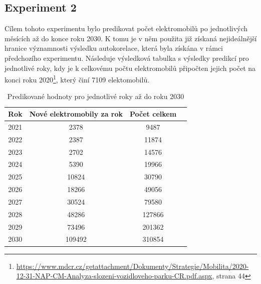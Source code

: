 \documentclass[14pt]{extarticle}
\begin{document}
    \subsection{Experiment 2}
    Cílem tohoto experimentu bylo predikovat počet elektromobilů po jednotlivých měsících až do konce roku 2030. K tomu je v něm použita již získaná nejideálnější hranice významnosti výsledku autokorelace, která byla získána v rámci předchozího experimentu. Následuje výsledková tabulka s výsledky predikcí pro jednotlivé roky, kdy je k celkovému počtu elektromobilů připočten jejich počet na konci roku 2020\footnote{\url{https://www.mdcr.cz/getattachment/Dokumenty/Strategie/Mobilita/2020-12-31-NAP-CM-Analyza-slozeni-vozidloveho-parku-CR.pdf.aspx}, strana 44}, který činí 7109 elektomobilů. 
    
    \begin{table}[H]
    \centering
    \captionsetup{justification=centering}
        \begin{tabular}{|c|c|c|c|}
        \hline
                 \textbf{Rok} & \textbf{Nové elektromobily za rok} & \textbf{Počet celkem} \\ \hline
                  2021         & 2378                                          & 9487                                     \\ \hline
                  2022         & 2387                                          & 11874                                   \\ \hline
                  2023         & 2702                                          & 14576                                    \\ \hline
                  2024         & 5390                                          & 19966                                    \\ \hline
                  2025         & 10824                                         & 30790                                    \\ \hline
                  2026         & 18266                                         & 49056                                    \\ \hline
                  2027         & 30524                                         & 79580                                 \\ \hline
                  2028         & 48286                                         & 127866                                   \\ \hline
                  2029         & 73496                                         & 201362                                   \\ \hline
                  2030         & 109492                                        & 310854       
                   \\ \hline
                  
        \end{tabular}
        \caption{Predikované hodnoty pro jednotlivé roky až do roku 2030}
\end{table}        
    
\end{document}
